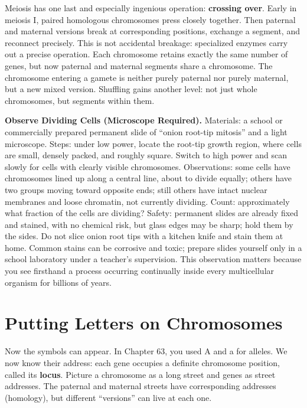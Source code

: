 Meiosis has one last and especially ingenious operation: \textbf{crossing over}. Early in meiosis I, paired homologous chromosomes press closely together. Then paternal and maternal versions break at corresponding positions, exchange a segment, and reconnect precisely. This is not accidental breakage: specialized enzymes carry out a precise operation. Each chromosome retains exactly the same number of genes, but now paternal and maternal segments share a chromosome. The chromosome entering a gamete is neither purely paternal nor purely maternal, but a new mixed version. Shuffling gains another level: not just whole chromosomes, but segments within them.

\begin{shiyan}
\textbf{Observe Dividing Cells (Microscope Required).} Materials: a school or commercially prepared permanent slide of ``onion root-tip mitosis'' and a light microscope. Steps: under low power, locate the root-tip growth region, where cells are small, densely packed, and roughly square. Switch to high power and scan slowly for cells with clearly visible chromosomes. Observations: some cells have chromosomes lined up along a central line, about to divide equally; others have two groups moving toward opposite ends; still others have intact nuclear membranes and loose chromatin, not currently dividing. Count: approximately what fraction of the cells are dividing? Safety: permanent slides are already fixed and stained, with no chemical risk, but glass edges may be sharp; hold them by the sides. Do not slice onion root tips with a kitchen knife and stain them at home. Common stains can be corrosive and toxic; prepare slides yourself only in a school laboratory under a teacher's supervision. This observation matters because you see firsthand a process occurring continually inside every multicellular organism for billions of years.
\end{shiyan}

\section{Putting Letters on Chromosomes}

Now the symbols can appear. In Chapter 63, you used A and a for alleles. We now know their address: each gene occupies a definite chromosome position, called its \textbf{locus}. Picture a chromosome as a long street and genes as street addresses. The paternal and maternal streets have corresponding addresses (homology), but different ``versions'' can live at each one.

